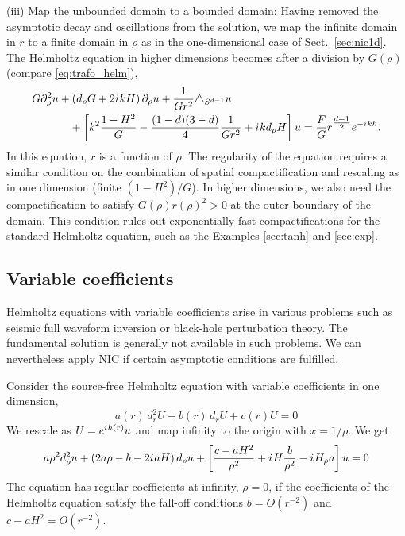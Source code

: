\documentclass[onefignum,onetabnum]{siamart190516}
\newcommand{\iu}{{i\mkern1mu}}
\begin{document}
\noindent (iii) Map the unbounded domain to a bounded domain: Having removed the asymptotic decay and oscillations from the solution, we map the infinite domain in $r$ to a finite domain in $\rho$ as in the one-dimensional case of Sect.~\ref{sec:nic1d}. The Helmholtz equation in higher dimensions becomes after a division by $G(\rho)$ (compare \eqref{eq:trafo_helm}),
\begin{equation}
\label{eq:hyp_general}
\begin{split}
G \partial_\rho^2 u &+ \left(d_\rho G + 2 \iu k H \right)\partial_\rho u
  + \frac{1}{G r^2}\triangle_{S^{d-1}} u \\
&\quad + \left[k^2 \frac{1-H^2}{G}
  - \frac{(1-d)(3-d)}{4}\frac{1}{G r^2}
  + \iu k d_\rho H \right] u
  = \frac{F}{G} r^{\tfrac{d-1}{2}} e^{-\iu k h}.
\end{split}
\end{equation}
In this equation, $r$ is a function of $\rho$. The regularity of the equation requires a similar condition on the combination of spatial compactification and rescaling as in one dimension (finite $(1-H^2)/G$). In higher dimensions, we also need the compactification to satisfy $G(\rho)r(\rho)^2>0$ at the outer boundary of the domain. This condition rules out exponentially fast compactifications for the standard Helmholtz equation, such as the Examples \ref{sec:tanh} and \ref{sec:exp}.
\subsection{Variable coefficients}

Helmholtz equations with variable coefficients arise in various problems such as seismic full waveform inversion or black-hole perturbation theory. The fundamental solution is generally not available in such problems. We can nevertheless apply NIC if certain asymptotic conditions are fulfilled.

Consider the source-free Helmholtz equation with variable coefficients in one dimension,
\[ a(r) \, d_r^2 U + b(r) \, d_r U + c(r) U = 0 \]
We rescale as $U=e^{\iu h(r)} u$ and map infinity to the origin with $x=1/\rho$. We get 
\[ a \rho^2 d_\rho^2 u + \left( 2 a \rho - b - 2 \iu a H \right) d_\rho u + \left[ \frac{c-a H^2}{\rho^2} + \iu H \frac{b}{\rho^2} - \iu H_\rho a \right] u = 0 \]
The equation has regular coefficients at infinity, $\rho=0$, if the coefficients of the Helmholtz equation satisfy the fall-off conditions $b=O(r^{-2})$ and $c-a H^2=O(r^{-2})$.
\end{document}

